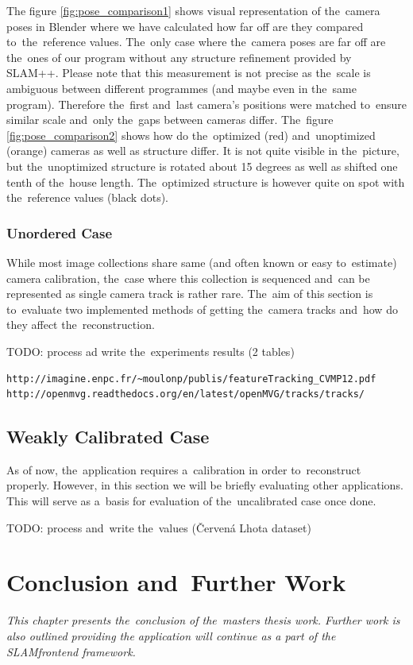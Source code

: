 The figure \ref{fig:pose_comparison1} shows visual representation of the~camera poses in Blender where we have calculated how far off are they compared to~the~reference values. The~only case where the~camera poses are far off are the~ones of our program without any structure refinement provided by SLAM++. Please note that this measurement is not precise as the~scale is ambiguous between different programmes (and maybe even in the~same program). Therefore the~first and~last camera's positions were matched to~ensure similar scale and~only the~gaps between cameras differ. The~figure \ref{fig:pose_comparison2} shows how do the~optimized (red) and~unoptimized (orange) cameras as well as structure differ. It is not quite visible in the~picture, but the~unoptimized structure is rotated about 15 degrees as well as shifted one tenth of the~house length. The~optimized structure is however quite on spot with the~reference values (black dots).

\subsection*{Unordered Case}
While most image collections share same (and often known or easy to~estimate) camera calibration, the~case where this collection is sequenced and~can be represented as single camera track is rather rare. The~aim of this section is to~evaluate two implemented methods of getting the~camera tracks and~how do they affect the~reconstruction.

TODO:  process ad write the~experiments results (2 tables)
\begin{verbatim}
http://imagine.enpc.fr/~moulonp/publis/featureTracking_CVMP12.pdf
http://openmvg.readthedocs.org/en/latest/openMVG/tracks/tracks/
\end{verbatim}
\section{Weakly Calibrated Case}
\label{sec:experiments-weakly}
As of now, the~application requires a~calibration in order to~reconstruct properly. However, in this section we will be briefly evaluating other applications. This will serve as a~basis for evaluation of the~uncalibrated case once done.

TODO: process and~write the~values (Červená Lhota dataset)

\chapter{Conclusion and~Further Work}
\label{chapter:conclusion}
\textit{This chapter presents the~conclusion of the~masters thesis work. Further work is also outlined providing the application will continue as a part of the SLAM\textunderscore frontend framework.}

